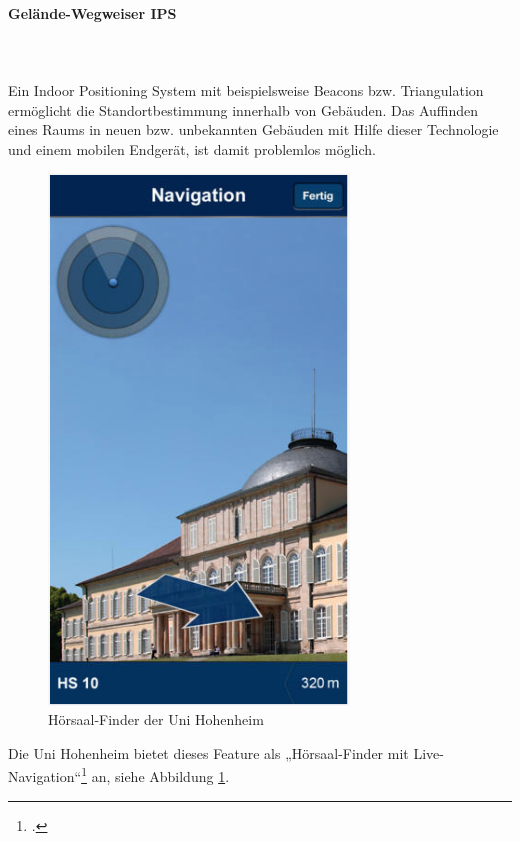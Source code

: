 \paragraph{Gelände-Wegweiser IPS}\mbox{}\\\\
Ein Indoor Positioning System mit beispielsweise Beacons bzw. Triangulation ermöglicht die Standortbestimmung innerhalb von Gebäuden. Das Auffinden eines Raums in neuen bzw. unbekannten Gebäuden mit Hilfe dieser Technologie und einem mobilen Endgerät, ist damit problemlos möglich. 
\newpage
\begin{figure}[h]
	\centering
	\includegraphics[width=8cm]{kapitel/gruppe1_2/bilder/live-navigation}
	\caption{Hörsaal-Finder der Uni Hohenheim}
	\label{fig_livenavi}
\end{figure}

Die Uni Hohenheim bietet dieses Feature als „Hörsaal-Finder mit Live-Navigation“\footcite{uni_hohenheim_itunes_2013} an, siehe Abbildung \ref{fig_livenavi}.

